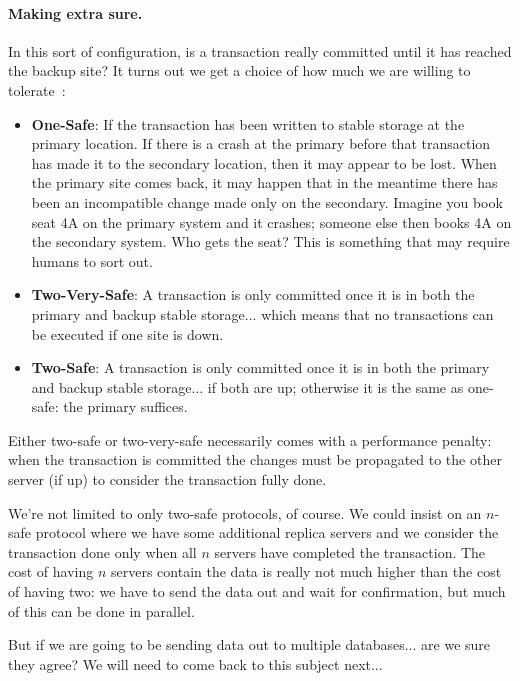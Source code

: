 \documentclass[a4paper]{report}
\begin{document}
\paragraph{Making extra sure.} In this sort of configuration, is a transaction really committed until it has reached the backup site? It turns out we get a choice of how much we are willing to tolerate~\cite{dsc}:

\begin{itemize}
	\item \textbf{One-Safe}: If the transaction has been written to stable storage at the primary location. If there is a crash at the primary before that transaction has made it to the secondary location, then it may appear to be lost. When the primary site comes back, it may happen that in the meantime there has been an incompatible change made only on the secondary. Imagine you book seat 4A on the primary system and it crashes; someone else then books 4A on the secondary system. Who gets the seat? This is something that may require humans to sort out.
	\item \textbf{Two-Very-Safe}: A transaction is only committed once it is in both the primary and backup stable storage... which means that no transactions can be executed if one site is down.
	\item \textbf{Two-Safe}: A transaction is only committed once it is in both the primary and backup stable storage... if both are up; otherwise it is the same as one-safe: the primary suffices. 
\end{itemize}

Either two-safe or two-very-safe necessarily comes with a performance penalty: when the transaction is committed the changes must be propagated to the other server (if up) to consider the transaction fully done.

We're not limited to only two-safe protocols, of course. We could insist on an $n$-safe protocol where we have some additional replica servers and we consider the transaction done only when all $n$ servers have completed the transaction. The cost of having $n$ servers contain the data is really not much higher than the cost of having two: we have to send the data out and wait for confirmation, but much of this can be done in parallel.

But if we are going to be sending data out to multiple databases... are we sure they agree? We will need to come back to this subject next...
\end{document}
